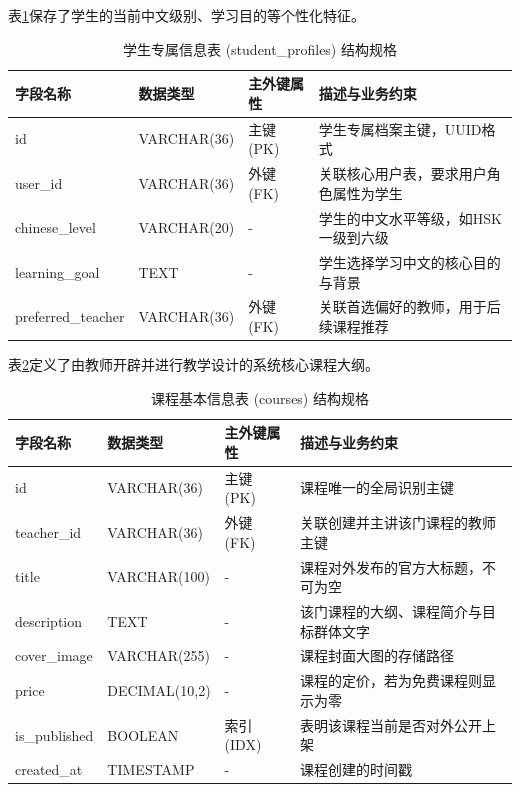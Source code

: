 表\ref{tab:db-student-profiles}保存了学生的当前中文级别、学习目的等个性化特征。

\begin{table}[H]
\centering
\caption{学生专属信息表 (student\_profiles) 结构规格}
\label{tab:db-student-profiles}
\begin{tabularx}{\textwidth}{lllX}
\toprule
字段名称 & 数据类型 & 主外键属性 & 描述与业务约束 \\
\midrule
id & VARCHAR(36) & 主键 (PK) & 学生专属档案主键，UUID格式 \\
user\_id & VARCHAR(36) & 外键 (FK) & 关联核心用户表，要求用户角色属性为学生 \\
chinese\_level & VARCHAR(20) & - & 学生的中文水平等级，如HSK一级到六级 \\
learning\_goal & TEXT & - & 学生选择学习中文的核心目的与背景 \\
preferred\_teacher & VARCHAR(36) & 外键 (FK) & 关联首选偏好的教师，用于后续课程推荐 \\
\bottomrule
\end{tabularx}
\end{table}

表\ref{tab:db-courses}定义了由教师开辟并进行教学设计的系统核心课程大纲。

\begin{table}[H]
\centering
\caption{课程基本信息表 (courses) 结构规格}
\label{tab:db-courses}
\begin{tabularx}{\textwidth}{lllX}
\toprule
字段名称 & 数据类型 & 主外键属性 & 描述与业务约束 \\
\midrule
id & VARCHAR(36) & 主键 (PK) & 课程唯一的全局识别主键 \\
teacher\_id & VARCHAR(36) & 外键 (FK) & 关联创建并主讲该门课程的教师主键 \\
title & VARCHAR(100) & - & 课程对外发布的官方大标题，不可为空 \\
description & TEXT & - & 该门课程的大纲、课程简介与目标群体文字 \\
cover\_image & VARCHAR(255) & - & 课程封面大图的存储路径 \\
price & DECIMAL(10,2) & - & 课程的定价，若为免费课程则显示为零 \\
is\_published & BOOLEAN & 索引 (IDX) & 表明该课程当前是否对外公开上架 \\
created\_at & TIMESTAMP & - & 课程创建的时间戳 \\
\bottomrule
\end{tabularx}
\end{table}

